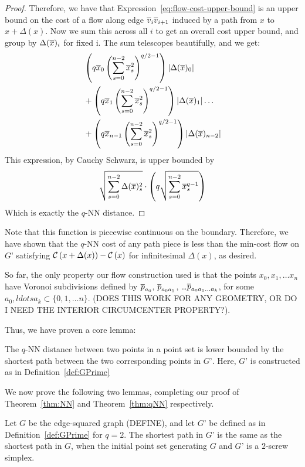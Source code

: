 {\begin{proof}
Therefore, we have that Expression~\ref{eq:flow-cost-upper-bound} is an upper bound on the cost of
a flow along edge $\overline{v}_i\overline{v}_{i+1}$ induced by a path from $x$ to $x+\Delta(x)$. Now we sum this across all $i$ to get an overall cost upper bound, and group by
$\Delta(\overline{x})_i$ for fixed i. The sum telescopes beautifully, and we get:
\begin{align}
&\left(q\overline{x}_0\left(\sum_{s=0}^{n-2} \overline{x}_s^2\right)^{q/2-1}\right)| \Delta(\overline{x})_0|
\\&+
\left(q\overline{x}_1\left(\sum_{s=0}^{n-2} \overline{x}_s^2\right)^{q/2-1}\right)| \Delta(\overline{x})_1|
\ldots
\\& +
\left(q\overline{x}_{n-1}\left(\sum_{s=0}^{n-2} \overline{x}_s^2\right)^{q/2-1}\right)| \Delta(\overline{x})_{n-2}|
\end{align}
This expression, by Cauchy Schwarz, is upper bounded by
\[
\sqrt{\sum_{s=0}^{n-2} \Delta(\overline{x})_s^2} \cdot \left(q\sqrt{\sum_{s=0}^{n-2}
\overline{x}_s^{q-1}}\right)
\]
Which is exactly the $q$-NN distance.

\end{proof}

Note that this function is piecewise continuous on the boundary. Therefore,
we have shown that the $q$-NN cost of any path piece is less than the
min-cost flow on $G’$ satisfying
$\mathcal{C}\left(x+\Delta(x)\right)-\mathcal{C}\left(x\right)$ for infinitesimal
$\Delta(x)$, as desired.

So far, the only property our flow construction used is that the points
$x_0, x_1, \ldots x_n$ have Voronoi subdivisions defined by $\overline{p}_{a_0}$,
$\overline{p}_{a_0a_1}$, \ldots $\overline{p}_{a_0a_1\ldots a_k}$, for some $a_0, ldots a_k
\subset \{0, 1, \ldots n\}$. (DOES THIS WORK FOR ANY GEOMETRY, OR DO I NEED
THE INTERIOR CIRCUMCENTER PROPERTY?).

Thus, we have proven a core lemma:

\begin{lemma}\label{lem:qNN-GPrime}

The $q$-NN distance between two points in a point set is lower bounded by
the shortest path between the two corresponding points in $G’$. Here, $G’$
is constructed as in Definition~\ref{def:GPrime}

\end{lemma}

We now prove the following two lemmas, completing our proof of
Theorem~\ref{thm:NN} and Theorem~\ref{thm:qNN} respectively.

\begin{lemma}\label{lem:edge-squared-GPrime} Let $G$ be the edge-squared graph
(DEFINE), and let $G’$ be defined as in Definition~\ref{def:GPrime} for $q=2$.
The shortest path in $G’$ is the same as the shortest path in $G$, when the
initial point set generating $G$ and $G’$ is a $2$-screw simplex.


\end{lemma}}
